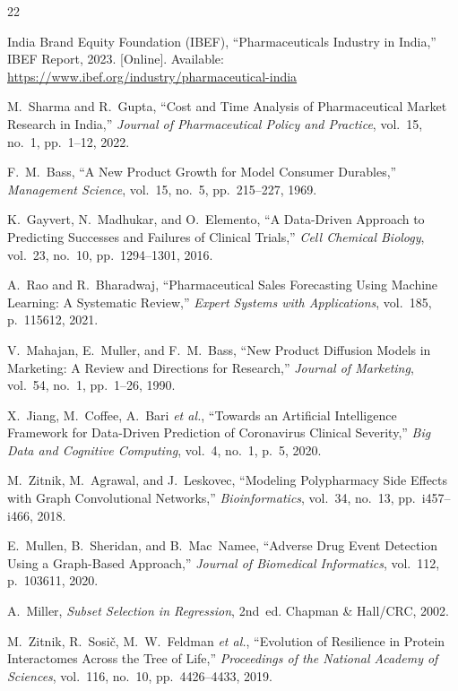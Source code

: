 \documentclass[10pt,journal,compsoc]{IEEEtran}
\newcommand{\etal}{\textit{et al.}}
\begin{document}
\begin{thebibliography}{22}

India Brand Equity Foundation (IBEF),
``Pharmaceuticals Industry in India,''
IBEF Report, 2023.
[Online]. Available: \url{https://www.ibef.org/industry/pharmaceutical-india}

M.~Sharma and R.~Gupta,
``Cost and Time Analysis of Pharmaceutical Market Research in India,''
\textit{Journal of Pharmaceutical Policy and Practice},
vol.~15, no.~1, pp.~1--12, 2022.

F.~M.~Bass,
``A New Product Growth for Model Consumer Durables,''
\textit{Management Science},
vol.~15, no.~5, pp.~215--227, 1969.

K.~Gayvert, N.~Madhukar, and O.~Elemento,
``A Data-Driven Approach to Predicting Successes and Failures of Clinical Trials,''
\textit{Cell Chemical Biology},
vol.~23, no.~10, pp.~1294--1301, 2016.

A.~Rao and R.~Bharadwaj,
``Pharmaceutical Sales Forecasting Using Machine Learning: A Systematic Review,''
\textit{Expert Systems with Applications},
vol.~185, p.~115612, 2021.

V.~Mahajan, E.~Muller, and F.~M.~Bass,
``New Product Diffusion Models in Marketing: A Review and Directions for Research,''
\textit{Journal of Marketing},
vol.~54, no.~1, pp.~1--26, 1990.

X.~Jiang, M.~Coffee, A.~Bari \etal,
``Towards an Artificial Intelligence Framework for Data-Driven Prediction of
Coronavirus Clinical Severity,''
\textit{Big Data and Cognitive Computing},
vol.~4, no.~1, p.~5, 2020.

M.~Zitnik, M.~Agrawal, and J.~Leskovec,
``Modeling Polypharmacy Side Effects with Graph Convolutional Networks,''
\textit{Bioinformatics},
vol.~34, no.~13, pp.~i457--i466, 2018.

E.~Mullen, B.~Sheridan, and B.~Mac~Namee,
``Adverse Drug Event Detection Using a Graph-Based Approach,''
\textit{Journal of Biomedical Informatics},
vol.~112, p.~103611, 2020.

A.~Miller,
\textit{Subset Selection in Regression}, 2nd~ed.
Chapman \& Hall/CRC, 2002.

M.~Zitnik, R.~Sosi\v{c}, M.~W.~Feldman \etal,
``Evolution of Resilience in Protein Interactomes Across the Tree of Life,''
\textit{Proceedings of the National Academy of Sciences},
vol.~116, no.~10, pp.~4426--4433, 2019.


\end{thebibliography}
\end{document}
